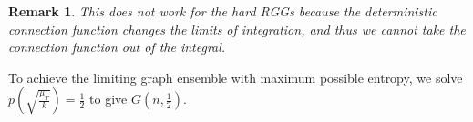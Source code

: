\documentclass{article}
\newtheorem{remark}{Remark}
\newcommand{\tti}{\rightarrow\infty}
\newcommand{\prob}[1]{\mathbb{P}\left(#1\right)}
\begin{document}
\begin{remark}
    This does not work for the hard RGGs because the deterministic connection function changes the limits of integration, and thus we cannot take the connection function out of the integral.
\end{remark}
To achieve the limiting graph ensemble with maximum possible entropy, we solve $p\left(\sqrt{\frac{\mu_T}{k}}\right) = \frac{1}{2}$ to give $G(n,\frac{1}{2})$.
\end{document}
